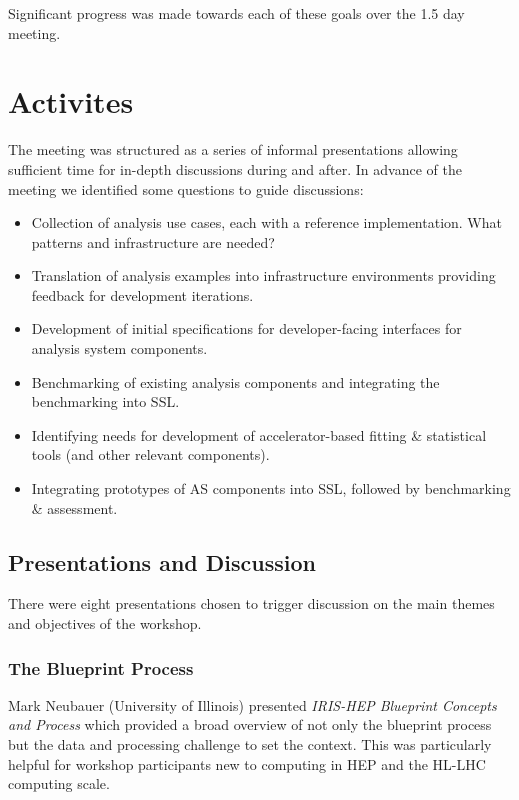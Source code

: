 \documentclass[11pt,letterpaper,fleqn]{article}
\begin{document}
Significant progress was made towards each of these goals over the 1.5 day meeting.


\section{Activites}

The meeting was structured as a series of informal presentations allowing sufficient time for in-depth discussions during and after.  In advance of the meeting we identified some questions to guide discussions:

\begin{itemize}
  \item Collection of analysis use cases, each with a reference implementation.  What patterns and infrastructure are needed?
  \item Translation of analysis examples into infrastructure environments providing feedback for development iterations.
  \item Development of initial specifications for developer-facing interfaces for analysis system components.
  \item Benchmarking of existing analysis components and integrating the benchmarking into SSL.
  \item Identifying needs for development of accelerator-based fitting \& statistical tools (and other relevant components).
  \item Integrating prototypes of AS components into SSL, followed by benchmarking \& assessment.
\end{itemize}

\subsection{Presentations and Discussion}

There were eight presentations chosen to trigger discussion on the main themes and objectives of the workshop.


\subsubsection{The Blueprint Process}
Mark Neubauer (University of Illinois) presented {\it IRIS-HEP Blueprint Concepts and Process} which provided a broad overview of not only the blueprint process but the data and processing challenge to set the context. This was particularly helpful for workshop participants new to computing in HEP and the HL-LHC computing scale.
\end{document}

